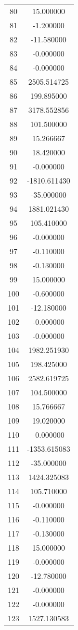 \documentclass[12pt]{article}
\begin{document}
\begin{longtable}{@{}cc@{}}
80 & 15.000000 \\
81 & -1.200000 \\
82 & -11.580000 \\
83 & -0.000000 \\
84 & -0.000000 \\
85 & 2505.514725 \\
86 & 199.895000 \\
87 & 3178.552856 \\
88 & 101.500000 \\
89 & 15.266667 \\
90 & 18.420000 \\
91 & -0.000000 \\
92 & -1810.611430 \\
93 & -35.000000 \\
94 & 1881.021430 \\
95 & 105.410000 \\
96 & -0.000000 \\
97 & -0.110000 \\
98 & -0.130000 \\
99 & 15.000000 \\
100 & -0.600000 \\
101 & -12.180000 \\
102 & -0.000000 \\
103 & -0.000000 \\
104 & 1982.251930 \\
105 & 198.425000 \\
106 & 2582.619725 \\
107 & 104.500000 \\
108 & 15.766667 \\
109 & 19.020000 \\
110 & -0.000000 \\
111 & -1353.615083 \\
112 & -35.000000 \\
113 & 1424.325083 \\
114 & 105.710000 \\
115 & -0.000000 \\
116 & -0.110000 \\
117 & -0.130000 \\
118 & 15.000000 \\
119 & -0.000000 \\
120 & -12.780000 \\
121 & -0.000000 \\
122 & -0.000000 \\
123 & 1527.130583 \\

\end{longtable}
\end{document}
